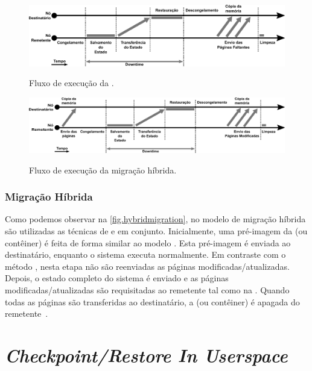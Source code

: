 \begin{figure}[bt]
    \centering
    \caption{Fluxo de execução da \postcopymigration.}
    \includegraphics[width=0.8\linewidth]{content/images/post-copy-migration-flow.pdf}
    \label{fig.postcopy}
\end{figure}

\begin{figure}[ht!]
    \centering
    \caption{Fluxo de execução da migração híbrida.}
    \includegraphics[width=0.8\linewidth]{content/images/hybrid-migration-flow.pdf}
    \label{fig.hybridmigration}
\end{figure}

\subsubsection{Migração Híbrida}\label{sec.hybridmigration}
Como podemos observar na \autoref{fig.hybridmigration}, no modelo de migração híbrida são utilizadas as técnicas de \precopy e \postcopy em conjunto. Inicialmente, uma pré-imagem da \vm (ou contêiner) é feita de forma similar ao modelo \precopymigration. Esta pré-imagem é enviada ao destinatário, enquanto o sistema executa normalmente. Em contraste com o método \precopy, nesta etapa não são reenviadas as páginas modificadas/atualizadas. Depois, o estado completo do sistema é enviado e as páginas modificadas/atualizadas são requisitadas ao remetente tal como na \postcopymigration. Quando todas as páginas são transferidas ao destinatário, a \vm (ou contêiner) é apagada do remetente~\cite{singh2022predictive, imran2022live}.

\section{\textit{Checkpoint/Restore In Userspace}}

